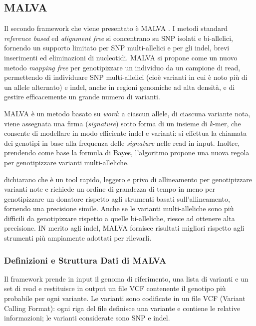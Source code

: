 \documentclass[../main.tex]{subfiles}
\begin{document}
\subsection{MALVA}
\label{malva}

Il secondo framework che viene presentato è MALVA \cite{bernardini2019malva}. I metodi standard \textit{reference based} ed \textit{alignment free} si concentrano su SNP isolati e bi-allelici, fornendo un supporto limitato per SNP multi-allelici e per gli indel, brevi inserimenti ed eliminazioni di nucleotidi. MALVA si propone come un nuovo metodo \textit{mapping free} per genotipizzare un individuo da un campione di read, permettendo di individuare SNP multi-allelici (cioè varianti in cui è noto più di un allele alternato) e indel, anche in regioni genomiche ad alta densità, e di gestire efficacemente un grande numero di varianti. 

MALVA è un metodo basato su \textit{word}: a ciascun allele, di ciascuna variante nota, viene assegnata una firma (\textit{signature}) sotto forma di un insieme di \textit{k}-mer, che consente di modellare in modo efficiente indel e varianti: si effettua la chiamata dei genotipi in base alla frequenza delle \textit{signature} nelle read in input. Inoltre, prendendo come base la formula di Bayes, l'algoritmo propone una nuova regola per genotipizzare varianti multi-alleliche.

\cite{bernardini2019malva} dichiarano che è un tool rapido, leggero e privo di allineamento per genotipizzare varianti note e richiede un ordine di grandezza di tempo in meno per genotipizzare un donatore rispetto agli strumenti basati sull'allineamento, fornendo una precisione simile. Anche se le varianti multi-alleliche sono più difficili da genotipizzare rispetto a quelle bi-alleliche, riesce ad ottenere alta precisione. IN merito agli indel, MALVA fornisce risultati migliori rispetto agli strumenti più ampiamente adottati per rilevarli. 


\subsubsection{Definizioni e Struttura Dati di MALVA}

Il framework prende in input il genoma di riferimento, una lista di varianti e un set di read e restituisce in output un file VCF contenente il genotipo più probabile per ogni variante. Le varianti sono codificate in un file VCF (Variant Calling Format): ogni riga del file definisce una variante e contiene le relative informazioni; le varianti considerate sono SNP e indel.
\end{document}

